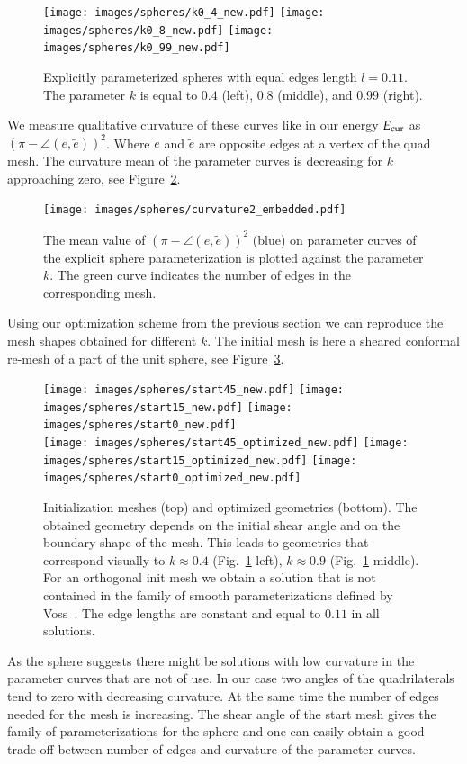 \documentclass[Thesis.tex]{subfiles}
\begin{document}
\begin{figure}
\centering
\texttt{[image: images/spheres/k0\_4\_new.pdf]}
\texttt{[image: images/spheres/k0\_8\_new.pdf]}
\texttt{[image: images/spheres/k0\_99\_new.pdf]}
\caption{Explicitly parameterized spheres with equal edges length $l=0.11$. The parameter $k$ is equal to $0.4$ (left), $0.8$ (middle), and $0.99$ (right).}
\label{fig:spheres}
\end{figure}

We measure qualitative curvature of these curves like in our energy $E_{\textrm{\scriptsize{cur}}}$ as $(\pi - \angle(e,\tilde e))^2$. Where $e$ and $\tilde e$ are opposite edges at a vertex of the quad mesh. The curvature mean of the parameter curves is decreasing for $k$ approaching zero, see Figure~\ref{fig:curvature_plot}.
\begin{figure}
\centering
\texttt{[image: images/spheres/curvature2\_embedded.pdf]}
\caption{The mean value of $(\pi - \angle(e,\tilde e))^2$ (blue) on parameter curves of the explicit sphere parameterization is plotted against the parameter $k$. The green curve indicates the number of edges in the corresponding mesh.}
\label{fig:curvature_plot}
\end{figure}
Using our optimization scheme from the previous section we can reproduce the mesh shapes obtained for different $k$. The initial mesh is here a sheared conformal re-mesh of a part of the unit sphere, see Figure~\ref{fig:spheres_optimized}.
\begin{figure}
\centering
\texttt{[image: images/spheres/start45\_new.pdf]}
\texttt{[image: images/spheres/start15\_new.pdf]}
\texttt{[image: images/spheres/start0\_new.pdf]}\\
\texttt{[image: images/spheres/start45\_optimized\_new.pdf]}
\texttt{[image: images/spheres/start15\_optimized\_new.pdf]}
\texttt{[image: images/spheres/start0\_optimized\_new.pdf]}
\caption{Initialization meshes (top) and optimized geometries (bottom). The obtained geometry depends on the initial shear angle and on the boundary shape of the mesh. This leads to geometries that correspond visually to $k\approx 0.4$ (Fig.~\ref{fig:spheres} left), $k\approx 0.9$ (Fig.~\ref{fig:spheres} middle). For an orthogonal init mesh we obtain a solution that is not contained in the family of smooth parameterizations defined by Voss~\cite{Voss1881}. 
The edge lengths are constant and equal to $0.11$ in all solutions.}
\label{fig:spheres_optimized}
\end{figure}
As the sphere suggests there might be solutions with low curvature in the parameter curves that are not of use. In our case two angles of the quadrilaterals tend to zero with decreasing curvature. At the same time the number of edges needed for the mesh is increasing. The shear angle of the start mesh gives the family of parameterizations for the sphere and one can easily obtain a good trade-off between number of edges and curvature of the parameter curves.
\end{document}
